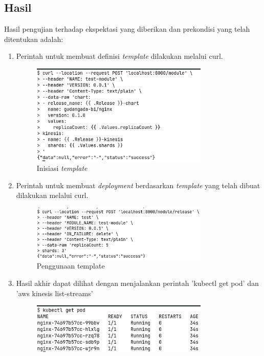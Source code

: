 \subsection{Hasil}
Hasil pengujian terhadap ekspektasi yang diberikan dan prekondisi yang telah ditentukan adalah:
\begin{enumerate}
    \item Perintah untuk membuat definisi \textit{template} dilakukan melalui curl.
    \begin{figure}
    	\centering
    	\includegraphics[width=0.8\textwidth]{pics/5.4.curlInitModule.png}
    	\caption{Inisiasi \textit{template}}
    	\label{fig:initTemplate}
    \end{figure}
    \item Perintah untuk membuat \textit{deployment} berdasarkan \textit{template} yang telah dibuat dilakukan melalui curl.
    \begin{figure}
    	\centering
    	\includegraphics[width=0.8\textwidth]{pics/5.4.curlResult.png}
    	\caption{Penggunaan template}
    	\label{fig:templateUsage}
    \end{figure}
    \item Hasil akhir dapat dilihat dengan menjalankan perintah 'kubectl get pod' dan 'aws kinesis list-streams'
    \begin{figure}
    	\centering
    	\includegraphics[width=0.8\textwidth]{pics/5.4.getPod.png}

\end{figure}
\end{enumerate}
